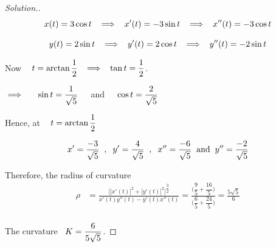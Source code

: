 \documentclass[11pt,a4paper]{article}
\theoremstyle{definition}
\newenvironment{solution}
  {\renewcommand{\qedsymbol}{}\begin{proof}[\textit{Solution}.]}
  {\end{proof}}
\begin{document}
\begin{solution}
$$x(t) = 3\cos t \hspace{0.2cm} \implies \hspace{0.2cm} x'(t) = -3\sin t\hspace{0.2cm} \implies \hspace{0.2cm} x''(t) = -3\cos t$$

$$y(t) = 2\sin t \hspace{0.2cm} \implies \hspace{0.2cm} y'(t) = 2\cos t \hspace{0.2cm} \implies \hspace{0.2cm} y''(t) = -2\sin t$$

Now $\hspace{0.3cm} t = \arctan \dfrac{1}{2}\hspace{0.2cm} \implies \hspace{0.2cm} \tan t = \dfrac{1}{2}$.


\begin{figure}[H]
\centering
{}
\end{figure}

$\implies\hspace{0.5cm} \sin t = \dfrac{1}{\sqrt{5}}\hspace{0.4cm}$ and $\hspace{0.4cm} \cos t = \dfrac{2}{\sqrt{5}}$


Hence, at $\hspace{0.3cm} t = \arctan\dfrac{1}{2}$

$$x' = \frac{-3}{\sqrt{5}}\hspace{0.2cm} , \hspace{0.2cm} y' = \frac{4}{\sqrt{5}}\hspace{0.2cm} , \hspace{0.2cm} x'' = \frac{-6}{\sqrt{5}}\hspace{0.2cm} \text{and} \hspace{0.2cm} y'' = \frac{-2}{\sqrt{5}}$$

Therefore, the radius of curvature
\begin{align*}
\rho & = \frac{\Big[\big[x'(t)\big]^2 + \big[y'(t)\big]^2\Big]^{\dfrac{3}{2}}}{x'(t)y''(t) - y'(t)x''(t)}
 = \frac{\Big(\dfrac{9}{5} + \dfrac{16}{5}\Big)}{\Big(\dfrac{6}{5} + \dfrac{24}{5}\Big)}
 = \frac{5\sqrt{5}}{6}\\
\end{align*}

The curvature $\hspace{0.2cm} K = \dfrac{6}{5\sqrt{5}}$.
\end{solution}
\end{document}
